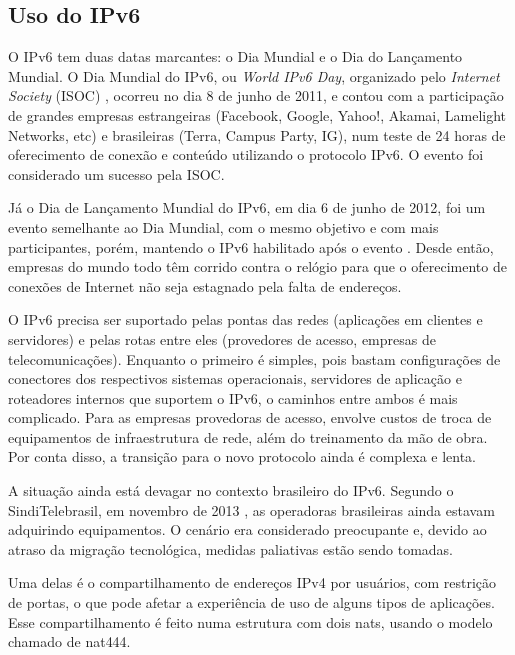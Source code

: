 
\subsection*{Uso do IPv6}

O IPv6 tem duas datas marcantes: o Dia Mundial e o Dia do Lançamento Mundial. O Dia
Mundial do IPv6, ou \emph{World IPv6 Day}, organizado pelo \emph{Internet Society}
(ISOC) \cite{site:isoc-ipv6day}, ocorreu no dia 8 de junho de 2011, e contou com a
participação de grandes empresas estrangeiras (Facebook, Google, Yahoo!, Akamai,
Lamelight Networks, etc) e brasileiras (Terra, Campus Party, IG), num teste de 24 horas
de oferecimento de conexão e conteúdo utilizando o protocolo IPv6. O evento foi
considerado um sucesso pela ISOC.

Já o Dia de Lançamento Mundial do IPv6, em dia 6 de junho de 2012, foi um evento
semelhante ao Dia Mundial, com o mesmo objetivo e com mais participantes, porém,
mantendo o IPv6 habilitado após o evento \cite{site:isoc-ipv6launch}. Desde então,
empresas do mundo todo têm corrido contra o relógio para que o oferecimento de conexões
de Internet não seja estagnado pela falta de endereços.

O IPv6 precisa ser suportado pelas pontas das redes (aplicações em clientes e
servidores) e pelas rotas entre eles (provedores de acesso, empresas de
telecomunicações). Enquanto o primeiro é simples, pois bastam configurações de
conectores dos respectivos sistemas operacionais, servidores de aplicação e roteadores
internos que suportem o IPv6, o caminhos entre ambos é mais complicado. Para as empresas
provedoras de acesso, envolve custos de troca de equipamentos de infraestrutura de
rede, além do treinamento da mão de obra. Por conta disso, a transição para o novo
protocolo ainda é complexa e lenta.

A situação ainda está devagar no contexto brasileiro do IPv6. Segundo o SindiTelebrasil,
em novembro de 2013 \cite{site:ipv6brasil}, as operadoras brasileiras ainda estavam
adquirindo equipamentos. O cenário era considerado preocupante e, devido ao atraso da
migração tecnológica, medidas paliativas estão sendo tomadas.

Uma delas é o compartilhamento de endereços IPv4 por usuários, com restrição de portas,
o que pode afetar a experiência de uso de alguns tipos de aplicações. Esse
compartilhamento é feito numa estrutura com dois \glspl*{nat}, usando o modelo chamado
de \gls*{nat}444.

